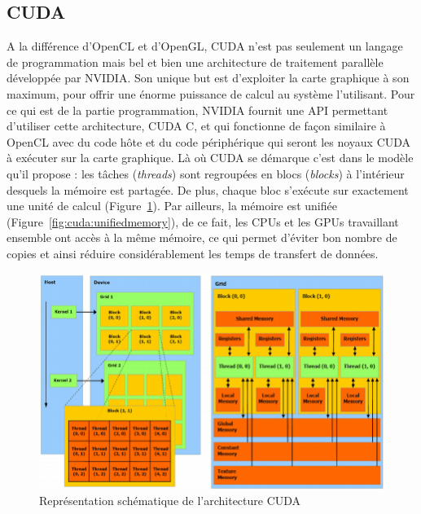 \subsection{CUDA} 
A la différence d'OpenCL et d'OpenGL, CUDA n'est pas seulement un langage de programmation mais bel et bien une architecture de traitement parallèle développée par NVIDIA. Son unique but est d'exploiter la carte graphique à son maximum, pour offrir une énorme puissance de calcul au système l'utilisant. Pour ce qui est de la partie programmation, NVIDIA fournit une API permettant d'utiliser cette architecture, CUDA C, et qui fonctionne de façon similaire à OpenCL avec du code hôte et du code périphérique qui seront les noyaux CUDA à exécuter sur la carte graphique. Là où CUDA se démarque c'est dans le modèle qu'il propose : les tâches (\emph{threads}) sont regroupées en blocs (\emph{blocks}) à l'intérieur desquels la mémoire est partagée. De plus, chaque bloc s'exécute sur exactement une unité de calcul (Figure~\ref{fig:cuda:archi}). Par ailleurs, la mémoire est unifiée (Figure~\ref{fig:cuda:unifiedmemory}), de ce fait, les CPUs et les GPUs travaillant ensemble ont accès à la même mémoire, ce qui permet d'éviter bon nombre de copies et ainsi réduire considérablement les temps de transfert de données.

\begin{figure}[H]
\centering
\includegraphics[width=0.9\linewidth]{images/cuda-archi}
\caption{Représentation schématique de l'architecture CUDA\protect\footnotemark}
\label{fig:cuda:archi}
\end{figure}

